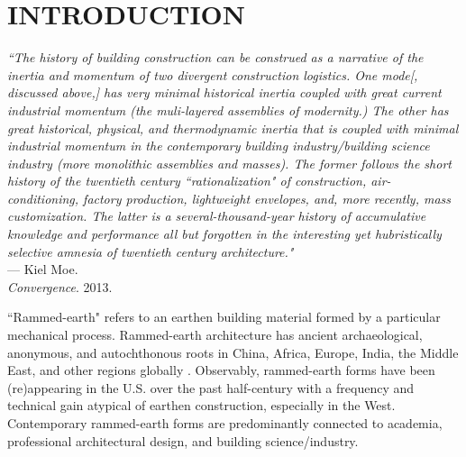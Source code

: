 \section{INTRODUCTION}

\begin{flushright}
  \small{
  \textit{``The history of building construction can be construed as a narrative of the inertia and momentum of two divergent construction logistics. One mode[, discussed above,] has very minimal historical inertia coupled with great current industrial momentum (the muli-layered assemblies of modernity.) The other has great historical, physical, and thermodynamic inertia that is coupled with minimal industrial momentum in the contemporary building industry/building science industry (more monolithic assemblies and masses). The former follows the short history of the twentieth century ``rationalization" of construction, air-conditioning, factory production, lightweight envelopes, and, more recently, mass customization. The latter is a several-thousand-year history of accumulative knowledge and performance all but forgotten in the interesting yet hubristically selective amnesia of twentieth century architecture."}}\\ --- Kiel Moe. \\ \textit{Convergence}. 2013.
\end{flushright}

``Rammed-earth" refers to an earthen building material formed by a particular mechanical process. Rammed-earth architecture has ancient archaeological, anonymous, and autochthonous roots in China, Africa, Europe, India, the Middle East, and other regions globally \cite{CHRONO}. Observably, rammed-earth forms have been (re)appearing in the U.S. over the past half-century with a frequency and technical gain atypical of earthen construction, especially in the West. Contemporary rammed-earth forms are predominantly connected to academia, professional architectural design, and building science/industry.


